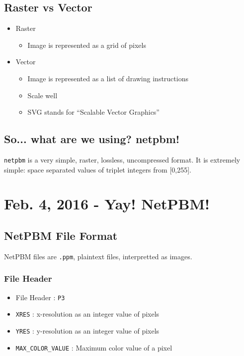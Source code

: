 \documentclass[11pt,fleqn]{article}
\theoremstyle{definition}
\begin{document}
\subsection{Raster vs Vector}
\begin{itemize}
    \item Raster
        \begin{itemize}
            \item Image is represented as a grid of pixels
        \end{itemize}
    \item Vector
        \begin{itemize}
            \item Image is represented as a list of drawing instructions
            \item Scale well
            \item SVG stands for ``Scalable Vector Graphics''
        \end{itemize}
\end{itemize}

\subsection{So... what are we using? netpbm!}
\texttt{netpbm} is a very simple, raster, lossless, uncompressed format. It is
extremely simple: space separated values of triplet integers from [0,255].

\newpage
\section{Feb. 4, 2016 - Yay! NetPBM!}

\subsection{NetPBM File Format}

NetPBM files are \texttt{.ppm}, plaintext files, interpretted as images.

\subsubsection{File Header}
\begin{itemize}
    \item File Header : \texttt{P3}
    \item \texttt{XRES} : x-resolution as an integer value of pixels
    \item \texttt{YRES} : y-resolution as an integer value of pixels
    \item \texttt{MAX\_COLOR\_VALUE} : Maximum color value of a pixel
\end{itemize}
\end{document}
